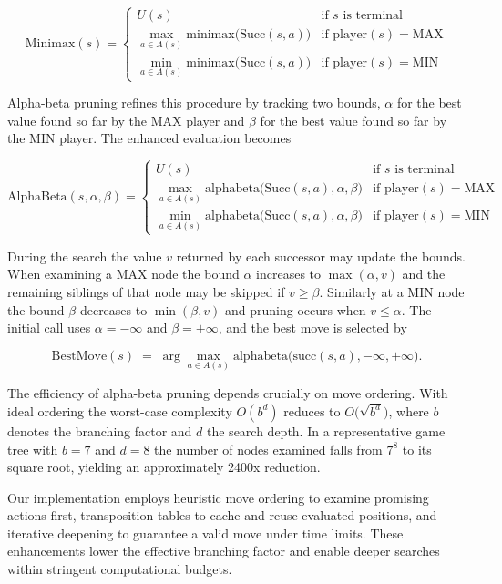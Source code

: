 \documentclass[12pt]{article}
\begin{document}
\[
\mathrm{Minimax}(s) =
\begin{cases}
U(s) & \text{if } s \text{ is terminal}\\
\max_{a\in A(s)} \mathrm{minimax}\bigl(\mathrm{Succ}(s,a)\bigr) & \text{if player}(s)=\mathrm{MAX}\\
\min_{a\in A(s)} \mathrm{minimax}\bigl(\mathrm{Succ}(s,a)\bigr) & \text{if player}(s)=\mathrm{MIN}
\end{cases}
\]

Alpha-beta pruning refines this procedure by tracking two bounds, \(\alpha\) for the best value found so far by the MAX player and \(\beta\) for the best value found so far by the MIN player. The enhanced evaluation becomes

\[
\mathrm{AlphaBeta}(s,\alpha,\beta) =
\begin{cases}
U(s) & \text{if } s \text{ is terminal}\\
\max_{a\in A(s)} \mathrm{alphabeta}\bigl(\mathrm{Succ}(s,a),\alpha,\beta\bigr) & \text{if player}(s)=\mathrm{MAX}\\
\min_{a\in A(s)} \mathrm{alphabeta}\bigl(\mathrm{Succ}(s,a),\alpha,\beta\bigr) & \text{if player}(s)=\mathrm{MIN}
\end{cases}
\]

During the search the value \(v\) returned by each successor may update the bounds. When examining a MAX node the bound \(\alpha\) increases to \(\max(\alpha,v)\) and the remaining siblings of that node may be skipped if \(v\ge\beta\). Similarly at a MIN node the bound \(\beta\) decreases to \(\min(\beta,v)\) and pruning occurs when \(v\le\alpha\). The initial call uses \(\alpha=-\infty\) and \(\beta=+\infty\), and the best move is selected by

\[
\mathrm{BestMove}(s) \;=\;\arg\max_{a\in A(s)}\mathrm{alphabeta}\bigl(\mathrm{succ}(s,a),-\infty,+\infty\bigr).
\]

The efficiency of alpha-beta pruning depends crucially on move ordering. With ideal ordering the worst-case complexity \(O(b^d)\) reduces to \(O\bigl(\sqrt{b^d}\bigr)\), where \(b\) denotes the branching factor and \(d\) the search depth. In a representative game tree with \(b=7\) and \(d=8\) the number of nodes examined falls from \(7^8\) to its square root, yielding an approximately 2400x reduction.

Our implementation employs heuristic move ordering to examine promising actions first, transposition tables to cache and reuse evaluated positions, and iterative deepening to guarantee a valid move under time limits. These enhancements lower the effective branching factor and enable deeper searches within stringent computational budgets.
\end{document}
